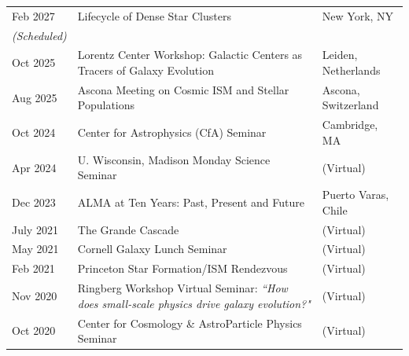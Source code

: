 \documentclass[11pt]{article}
\begin{document}
\begin{longtable}{p{} p{}p{}}

Feb 2027 & Lifecycle of Dense Star Clusters & {\small New York, NY}\\
{\small \em (Scheduled)} &&\\

Oct 2025  & Lorentz Center Workshop: Galactic Centers as Tracers of Galaxy Evolution& {\small Leiden, Netherlands} \\


Aug 2025 & Ascona Meeting on Cosmic ISM and Stellar Populations & {\small Ascona, Switzerland}\\

Oct 2024 & Center for Astrophysics (CfA) Seminar & {\small Cambridge, MA}\\

Apr 2024 & U. Wisconsin, Madison Monday Science Seminar & {\small (Virtual)}\\
 
Dec 2023 & ALMA at Ten Years: Past, Present and Future & {\small Puerto Varas, Chile}\\

July 2021 & The Grande Cascade & {\small (Virtual)}\\

 May 2021 & Cornell Galaxy Lunch Seminar & {\small (Virtual)}\\

 Feb 2021 & Princeton Star Formation/ISM Rendezvous &{\small (Virtual)} \\

 Nov 2020 & Ringberg Workshop Virtual Seminar: {\em ``How does small-scale physics drive galaxy evolution?"}  & {\small (Virtual)}\\

 Oct 2020 & Center for Cosmology \& AstroParticle Physics Seminar & {\small (Virtual)}\\

\end{longtable}
\vspace{-12pt}
\end{document}

